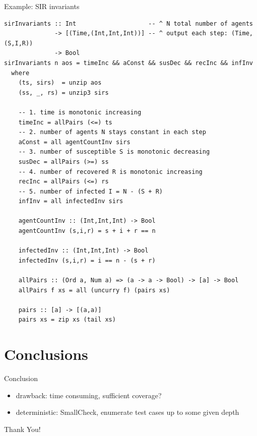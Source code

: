 \documentclass{beamer} %
\begin{document}
\begin{frame}[fragile]{Example: SIR invariants}
\begin{verbatim}
sirInvariants :: Int                    -- ^ N total number of agents
              -> [(Time,(Int,Int,Int))] -- ^ output each step: (Time, (S,I,R))
              -> Bool
sirInvariants n aos = timeInc && aConst && susDec && recInc && infInv
  where
    (ts, sirs)  = unzip aos
    (ss, _, rs) = unzip3 sirs

    -- 1. time is monotonic increasing
    timeInc = allPairs (<=) ts
    -- 2. number of agents N stays constant in each step
    aConst = all agentCountInv sirs
    -- 3. number of susceptible S is monotonic decreasing
    susDec = allPairs (>=) ss
    -- 4. number of recovered R is monotonic increasing
    recInc = allPairs (<=) rs
    -- 5. number of infected I = N - (S + R)
    infInv = all infectedInv sirs

    agentCountInv :: (Int,Int,Int) -> Bool
    agentCountInv (s,i,r) = s + i + r == n

    infectedInv :: (Int,Int,Int) -> Bool
    infectedInv (s,i,r) = i == n - (s + r)

    allPairs :: (Ord a, Num a) => (a -> a -> Bool) -> [a] -> Bool
    allPairs f xs = all (uncurry f) (pairs xs)

    pairs :: [a] -> [(a,a)]
    pairs xs = zip xs (tail xs)
\end{verbatim}
\end{frame}

\section{Conclusions}
\begin{frame}{Conclusion}
	\begin{itemize}
		\item drawback: time consuming, sufficient coverage?
		\item deterministic: SmallCheck, enumerate test cases up to some given depth
	\end{itemize}
\end{frame}

\begin{frame}{}
  \begin{center}
  Thank You!
  \end{center}
\end{frame}



\end{document}
